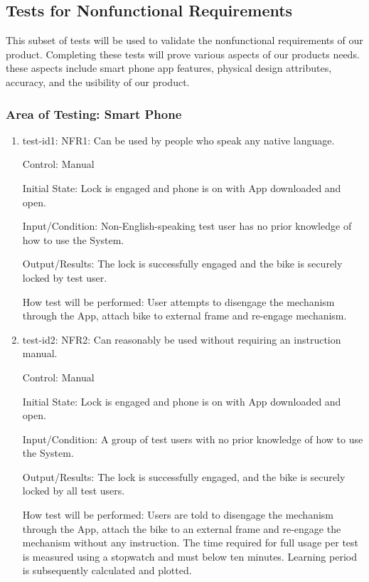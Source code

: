 \documentclass[12pt, titlepage]{article}
\begin{document}
\subsection{Tests for Nonfunctional Requirements}

This subset of tests will be used to validate the nonfunctional requirements of our product. Completing these tests will prove various aspects of our products needs. these aspects include smart phone app features, physical design attributes, accuracy, and the usibility of our product.

\subsubsection{Area of Testing: Smart Phone}

\begin{enumerate}

\item{test-id1: NFR1: Can be used by people who speak any native language. \\}

Control: Manual

Initial State: Lock is engaged and phone is on with App downloaded and open.

Input/Condition: Non-English-speaking test user has no prior knowledge of how to use the System.

Output/Results: The lock is successfully engaged and the bike is securely locked by test user.

How test will be performed: User attempts to disengage the mechanism through the App, attach bike to external frame and re-engage mechanism.
					
\item{test-id2: NFR2: Can reasonably be used without requiring an instruction manual. \\}

Control: Manual

Initial State: Lock is engaged and phone is on with App downloaded and open.

Input/Condition: A group of test users with no prior knowledge of how to use the System. 

Output/Results: The lock is successfully engaged, and the bike is securely locked by all test users.

How test will be performed: Users are told to disengage the mechanism through the App, attach the bike to an external frame and re-engage the mechanism without any instruction. The time required for full usage per test is measured using a stopwatch and must below ten minutes. Learning period is subsequently calculated and plotted. 


\end{enumerate}
\end{document}

